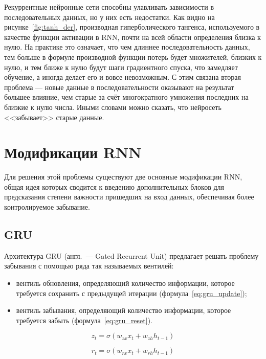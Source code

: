 Рекуррентные нейронные сети способны улавливать зависимости в последовательных данных, но у них есть недостатки. Как видно на рисунке \ref*{fig:tanh_der}, производная гиперболического тангенса, используемого в качестве функции активации в RNN, почти на всей области определения близка к нулю. На практике это означает, что чем длиннее последовательность данных, тем больше в формуле производной функции потерь будет множителей, близких к нулю, и тем ближе к нулю будут шаги градиентного спуска, что замедляет обучение, а иногда делает его и вовсе невозможным. С этим связана вторая проблема --- новые данные в последовательности оказывают на результат большее влияние, чем старые за счёт многократного умножения последних на близкие к нулю числа. Иными словами можно сказать, что нейросеть <<забывает>> старые данные.

\section{Модификации RNN}

Для решения этой проблемы существуют две основные модификации RNN, общая идея которых сводится к введению дополнительных блоков для предсказания степени важности пришедших на вход данных, обеспечивая более контролируемое забывание.

\subsection{GRU}

Архитектура GRU (англ. --- Gated Recurrent Unit) предлагает решать проблему забывания с помощью ряда так называемых вентилей:
\begin{itemize}
    \item вентиль обновления, определяющий количество информации, которое требуется сохранить с предыдущей итерации (формула \ref*{eq:gru_update});
    \item вентиль забывания, определяющий количество информации, которое требуется забыть (формула \ref*{eq:gru_reset}).
\end{itemize}

\begin{equation}
    \label{eq:gru_update}
    z_t = \sigma(w_{zx}x_t+w_{zh}h_{t-1})
\end{equation}

\begin{equation}
    \label{eq:gru_reset}
    r_t = \sigma(w_{rx}x_t+w_{rh}h_{t-1})
\end{equation}

